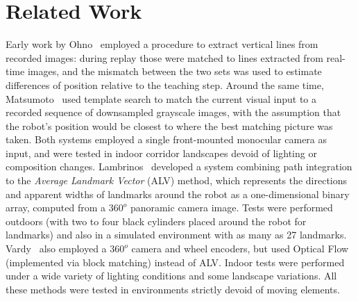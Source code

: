 \documentclass[twocolumn, 9pt,fleqn]{jsproceedings}
\begin{document}
\section{Related Work}

Early work by Ohno~\cite{OYA96} employed a procedure to extract vertical lines from recorded images: during replay those were matched to lines extracted from real-time images, and the mismatch between the two sets was used to estimate differences of position relative to the teaching step. Around the same time, Matsumoto~\cite{MAT96} used template search to match the current visual input to a recorded sequence of downsampled grayscale images, with the assumption that the robot's position would be closest to where the best matching picture was taken. Both systems employed a single front-mounted monocular camera as input, and were tested in indoor corridor landscapes devoid of lighting or composition changes. Lambrinos~\cite{LAM00} developed a system combining path integration to the \textit{Average Landmark Vector} (ALV) method, which represents the directions and apparent widths of landmarks around the robot as a one-dimensional binary array, computed from a $360^o$ panoramic camera image. Tests were performed outdoors (with two to four black cylinders placed around the robot for landmarks) and also in a simulated environment with as many as 27 landmarks. Vardy~\cite{VAR05} also employed a $360^o$ camera and wheel encoders, but used Optical Flow (implemented via block matching) instead of ALV. Indoor tests were performed under a wide variety of lighting conditions and some landscape variations. All these methods were tested in environments strictly devoid of moving elements.
\end{document}
